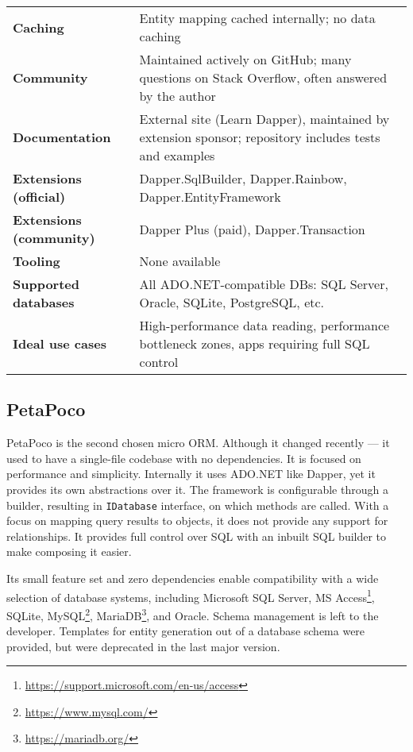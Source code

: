 \begin{table}[H]
\begin{tabular}{|l|l|}
\textbf{Caching} & Entity mapping cached internally; no data caching \\
\textbf{Community} & Maintained actively on GitHub; many questions on Stack Overflow, often answered by the author \\
\textbf{Documentation} & External site (Learn Dapper), maintained by extension sponsor; repository includes tests and examples \\
\textbf{Extensions (official)} & Dapper.SqlBuilder, Dapper.Rainbow, Dapper.EntityFramework \\
\textbf{Extensions (community)} & Dapper Plus (paid), Dapper.Transaction \\
\textbf{Tooling} & None available \\
\textbf{Supported databases} & All ADO.NET-compatible DBs: SQL Server, Oracle, SQLite, PostgreSQL, etc. \\
\textbf{Ideal use cases} & High-performance data reading, performance bottleneck zones, apps requiring full SQL control \\
\bottomrule
\end{tabular}
\end{table}

\subsection{PetaPoco}\label{sec:feat_petapoco}

PetaPoco\cite{PetaPoco} is the second chosen micro ORM. Although it changed recently --- it used to have a single-file codebase with no dependencies. It is focused on performance and simplicity. Internally it uses ADO.NET like Dapper, yet it provides its own abstractions over it. The framework is configurable through a builder, resulting in \texttt{IDatabase} interface, on which methods are called. With a focus on mapping query results to objects, it does not provide any support for relationships. It provides full control over SQL with an inbuilt SQL builder to make composing it easier. 

Its small feature set and zero dependencies enable compatibility with a wide selection of database systems, including Microsoft SQL Server, MS Access\footnote{\url{https://support.microsoft.com/en-us/access}}, SQLite, MySQL\footnote{\url{https://www.mysql.com/}}, MariaDB\footnote{\url{https://mariadb.org/}}, and Oracle. Schema management is left to the developer. Templates for entity generation out of a database schema were provided, but were deprecated in the last major version.


